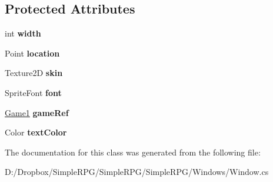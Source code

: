 \subsection*{Protected Attributes}
\begin{DoxyCompactItemize}
\item 
\hypertarget{class_simple_r_p_g_1_1_windows_1_1_window_ad22a60b848c0e7118745c529f1ccd702}{int {\bfseries width}}\label{class_simple_r_p_g_1_1_windows_1_1_window_ad22a60b848c0e7118745c529f1ccd702}

\item 
\hypertarget{class_simple_r_p_g_1_1_windows_1_1_window_aae95399621f4410ffbef8f869f72f521}{Point {\bfseries location}}\label{class_simple_r_p_g_1_1_windows_1_1_window_aae95399621f4410ffbef8f869f72f521}

\item 
\hypertarget{class_simple_r_p_g_1_1_windows_1_1_window_a44a13f36ab800ee3d2d9aa2f36506fd0}{Texture2\+D {\bfseries skin}}\label{class_simple_r_p_g_1_1_windows_1_1_window_a44a13f36ab800ee3d2d9aa2f36506fd0}

\item 
\hypertarget{class_simple_r_p_g_1_1_windows_1_1_window_aaf2e3e1c8b30e500ce4cebf06f8917ea}{Sprite\+Font {\bfseries font}}\label{class_simple_r_p_g_1_1_windows_1_1_window_aaf2e3e1c8b30e500ce4cebf06f8917ea}

\item 
\hypertarget{class_simple_r_p_g_1_1_windows_1_1_window_ae684d28fca3747c4785d025504284d24}{\hyperlink{class_simple_r_p_g_1_1_game1}{Game1} {\bfseries game\+Ref}}\label{class_simple_r_p_g_1_1_windows_1_1_window_ae684d28fca3747c4785d025504284d24}

\item 
\hypertarget{class_simple_r_p_g_1_1_windows_1_1_window_a0e75e20f1345fcce9df4dddbaefe054c}{Color {\bfseries text\+Color}}\label{class_simple_r_p_g_1_1_windows_1_1_window_a0e75e20f1345fcce9df4dddbaefe054c}

\end{DoxyCompactItemize}


The documentation for this class was generated from the following file\+:\begin{DoxyCompactItemize}
\item 
D\+:/\+Dropbox/\+Simple\+R\+P\+G/\+Simple\+R\+P\+G/\+Simple\+R\+P\+G/\+Windows/Window.\+cs\end{DoxyCompactItemize}

